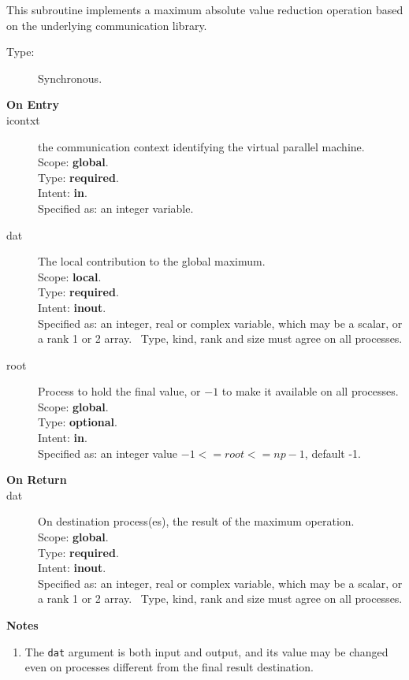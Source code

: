 This subroutine implements a maximum absolute value reduction
operation based on the underlying communication library. 
\begin{description}
\item[Type:] Synchronous.
\item[\bf  On Entry ]
\item[icontxt] the communication context identifying the virtual
  parallel machine.\\
Scope: {\bf global}.\\
Type: {\bf required}.\\
Intent: {\bf in}.\\
Specified as: an integer variable.
\item[dat] The local contribution to the global maximum.\\
Scope: {\bf local}.\\
Type: {\bf required}.\\
Intent: {\bf inout}.\\
Specified as: an integer, real or complex variable, which may be a
scalar, or a rank 1 or 2 array. \
Type, kind, rank and size must agree on all processes.
\item[root] Process to hold the final value, or $-1$ to make it available
  on all processes.\\
Scope: {\bf global}.\\
Type: {\bf optional}.\\
Intent: {\bf in}.\\
Specified as: an integer value $-1<= root <= np-1$, default -1. \\
\end{description}


\begin{description}
\item[\bf On Return]
\item[dat] On destination process(es), the result of the maximum operation.\\
Scope: {\bf global}.\\
Type: {\bf required}.\\
Intent: {\bf inout}.\\
Specified as: an integer, real or complex variable, which may be a
scalar, or a rank 1 or 2 array. \
Type, kind, rank and size must agree on all processes.
\end{description}


{\par\noindent\large\bfseries Notes}
\begin{enumerate}
\item The \verb|dat| argument is both input and output, and its
  value may be changed even on processes different from the final
  result destination.
\end{enumerate}

